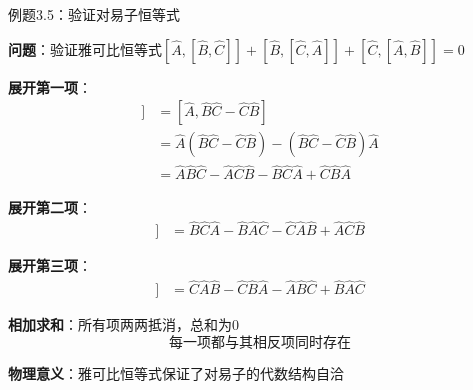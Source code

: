 \documentclass[aspectratio=169, 10pt]{beamer}
\begin{document}
\begin{frame}{例题3.5：验证对易子恒等式}

  \textbf{问题}：验证雅可比恒等式$[\hat{A}, [\hat{B}, \hat{C}]] + [\hat{B}, [\hat{C}, \hat{A}]] + [\hat{C}, [\hat{A}, \hat{B}]] = 0$

  \begin{iqbitemize}
    \item \textbf{展开第一项}：
    \begin{align*}
      [\hat{A}, [\hat{B}, \hat{C}]] &= [\hat{A}, \hat{B}\hat{C} - \hat{C}\hat{B}] \\
      &= \hat{A}(\hat{B}\hat{C} - \hat{C}\hat{B}) - (\hat{B}\hat{C} - \hat{C}\hat{B})\hat{A} \\
      &= \hat{A}\hat{B}\hat{C} - \hat{A}\hat{C}\hat{B} - \hat{B}\hat{C}\hat{A} + \hat{C}\hat{B}\hat{A}
    \end{align*}

    \item \textbf{展开第二项}：
    \begin{align*}
      [\hat{B}, [\hat{C}, \hat{A}]] &= \hat{B}\hat{C}\hat{A} - \hat{B}\hat{A}\hat{C} - \hat{C}\hat{A}\hat{B} + \hat{A}\hat{C}\hat{B}
    \end{align*}

    \item \textbf{展开第三项}：
    \begin{align*}
      [\hat{C}, [\hat{A}, \hat{B}]] &= \hat{C}\hat{A}\hat{B} - \hat{C}\hat{B}\hat{A} - \hat{A}\hat{B}\hat{C} + \hat{B}\hat{A}\hat{C}
    \end{align*}

    \item \textbf{相加求和}：所有项两两抵消，总和为0
    \[
      \text{每一项都与其相反项同时存在}
    \]

    \item \textbf{物理意义}：雅可比恒等式保证了对易子的代数结构自洽
  \end{iqbitemize}

\end{frame}
\end{document}
